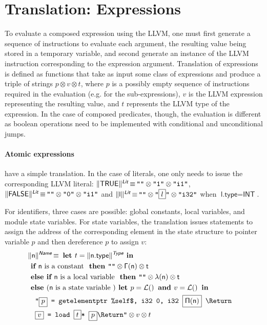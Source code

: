 \documentclass{llncs}
\newcommand{\trad}[2]{\ensuremath{\lVert \textsf{#1} \rVert^{\textit{#2}}}}
\newcommand{\nl}[0]{\text{\Return}}
\DeclareMathOperator{\isdef}{\equiv}
\DeclareMathOperator{\name}{\mathcal{L}()}
\newcommand{\llvm}[1]{\texttt{#1}}
\newcommand{\B}[1]{\textsf{#1}}
\newcommand{\IF}[0]{\textbf{ if }}
\newcommand{\ELSIF}[0]{\textbf{ else if }}
\newcommand{\ELSE}[0]{\textbf{ else }}
\newcommand{\THEN}[0]{\textbf{ then }}
\newcommand{\LET}[0]{\textbf{ let }}
\newcommand{\IN}[0]{\textbf{ in }}
\newcommand{\AND}[0]{\textbf{ and }}
\newcommand{\PH}[1]{\framebox{$#1$}}
\newcommand{\sep}[0]{\otimes}
\newcommand{\Global}[0]{\ensuremath{\sf\Gamma}}
\newcommand{\local}[0]{\ensuremath{\sf\lambda}}
\newcommand{\idx}[0]{\ensuremath{\sf\Pi}}
\begin{document}
\section{Translation: Expressions
  \label{sec:expr}}

To evaluate a composed expression using the LLVM, one must first generate a
sequence of instructions to evaluate each argument, the resulting value being
stored in a temporary variable, and second generate an instance of the LLVM
instruction corresponding to the expression argument.  Translation of
expressions is defined as functions that take as input some class of expressions
and produce a triple of strings $p \sep v \sep t$, where $p$ is a possibly empty
sequence of instructions required in the evaluation (e.g.  for the
sub-expressions), $v$ is the LLVM expression representing the resulting value,
and $t$ represents the LLVM type of the expression. In the case of composed
predicates, though, the evaluation is different as boolean operations need to be
implemented with conditional and unconditional jumps.

\paragraph{Atomic expressions} have a simple translation. In the case of
literals, one only needs to issue the corresponding LLVM literal:
$\trad{TRUE}{\B{Lit}} \isdef \llvm{""} \sep \llvm{"1"} \sep \llvm{"i1"}$,
$\trad{FALSE}{\B{Lit}} \isdef \llvm{""} \sep \llvm{"0"} \sep \llvm{"i1"}$ and
$\trad{l}{\B{Lit}} \isdef \llvm{""} \sep \llvm{"\PH{l}"} \sep \llvm{"i32"}$ when
$\B{l.type} = \B{INT}$.

For identifiers, three cases are possible: global constants, local variables,
and module state variables. For state variables, the translation issues
statements to assign the address of the corresponding element in the state
structure to pointer variable $p$ and then dereference $p$ to assign $v$:
\begin{align*}
\lefteqn{\trad{n}{\B{Name}} \isdef \LET t = \trad{n.type}{\B{Type}} \IN} \\
& \IF \B{n} \mbox{ is a constant } \THEN \llvm{""} \sep \Global(\B{n}) \sep t \\
& \ELSIF \B{n} \mbox{ is a local variable } \THEN 
\llvm{""} \sep \local(\B{n}) \sep t \\
& \ELSE (\B{n} \mbox{ is a state variable }) \LET p = \name \AND v = \name \IN \\
& \quad \llvm{"\PH{p} = getelementptr \%self\$, i32 0, i32 \PH{\idx(\B{n})} \nl} \\
& \quad \llvm{\PH{v} = load \PH{t}* \PH{p}\nl"} \sep v \sep t
\end{align*}
\end{document}
